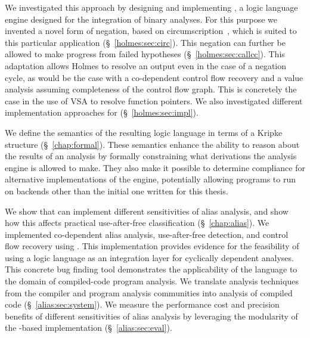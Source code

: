 We investigated this approach by designing and implementing \sysname, a logic language engine designed for the integration of binary analyses.
For this purpose we invented a novel form of negation, based on circumscription~\cite{circumscription}, which is suited to this particular application (\S~\ref{holmes:sec:circ}).
This negation can further be allowed to make progress from failed hypotheses (\S~\ref{holmes:sec:callcc}).
This adaptation allows Holmes to resolve an output even in the case of a negation cycle, as would be the case with a co-dependent control flow recovery and a value analysis assuming completeness of the control flow graph.
This is concretely the case in the use of VSA to resolve function pointers.
We also investigated different implementation approaches for \sysname (\S~\ref{holmes:sec:impl}).

We define the semantics of the resulting logic language in terms of a Kripke structure (\S~\ref{chap:formal}).
These semantics enhance the ability to reason about the results of an analysis by formally constraining what derivations the analysis engine is allowed to make.
They also make it possible to determine compliance for alternative implementations of the engine, potentially allowing programs to run on backends other than the initial one written for this thesis.

We show that \sysname can implement different sensitivities of alias analysis, and show how this affects practical use-after-free classification (\S~\ref{chap:alias}).
We implemented co-dependent alias analysis, use-after-free detection, and control flow recovery using \sysname.
This implementation provides evidence for the feasibility of using a logic language as an integration layer for cyclically dependent analyses.
This concrete bug finding tool demonstrates the applicability of the \sysname language to the domain of compiled-code program analysis.
We translate analysis techniques from the compiler and program analysis communities into analysis of compiled code (\S~\ref{alias:sec:system}).
We measure the performance cost and precision benefits of different sensitivities of alias analysis by leveraging the modularity of the \sysname-based implementation (\S~\ref{alias:sec:eval}).

